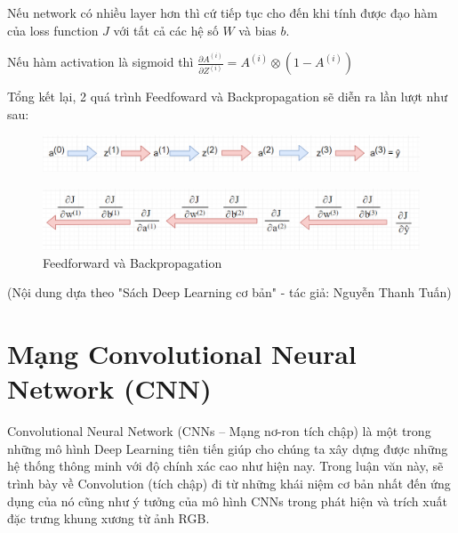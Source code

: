 Nếu network có nhiều layer hơn thì cứ tiếp tục cho đến khi tính được đạo hàm của loss function $J$ với tất cả các hệ số $W$ và bias $b$.

Nếu hàm activation là sigmoid thì $\frac{\partial A^{(i)}}{\partial Z^{(i)}} = A^{(i)} \otimes (1-A^{(i)})$

Tổng kết lại, 2 quá trình Feedfoward và Backpropagation sẽ diễn ra lần lượt như sau:


\begin{figure}[htp]
\begin{center}
\includegraphics[scale=0.7]{chap2/c2_figs/7.png}
\end{center}
\end{figure}



\begin{figure}[htp]
\begin{center}
\includegraphics[scale=0.65]{chap2/c2_figs/8.png}
\end{center}
\caption{Feedforward và Backpropagation}
\label{fig:backpropagation}
\end{figure}


(Nội dung dựa theo "Sách Deep Learning cơ bản" - tác giả: Nguyễn Thanh Tuấn)

\section{Mạng Convolutional Neural Network (CNN)}
Convolutional Neural Network (CNNs – Mạng nơ-ron tích chập) là một trong những mô hình Deep Learning tiên tiến giúp cho chúng ta xây dựng được những hệ thống thông minh với độ chính xác cao như hiện nay. Trong luận văn này, sẽ trình bày về Convolution (tích chập) đi từ những khái niệm cơ bản nhất đến ứng dụng của nó cũng như ý tưởng của mô hình CNNs trong phát hiện và trích xuất đặc trưng khung xương từ ảnh RGB.

